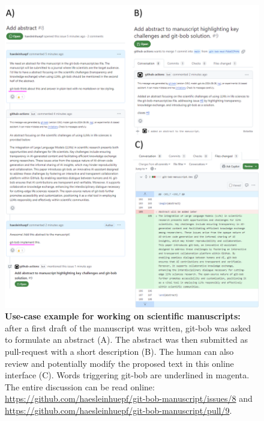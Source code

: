 \documentclass[sn-mathphys-num]{sn-jnl}%
\theoremstyle{thmstyleone}%
\theoremstyle{thmstyletwo}%
\theoremstyle{thmstylethree}%
\begin{document}
\begin{appendices}
\begin{figure}[h]
\centering
\includegraphics[width=\textwidth]{example_abstract_generation.png}
\caption{\textbf{Use-case example for working on scientific manuscripts:} after a first draft of the manuscript was written, git-bob was asked to formulate an abstract (A). The abstract was then submitted as pull-request with a short description (B). The human can also review and potentially modify the proposed text in this online interface (C). Words triggering git-bob are underlined in magenta. The entire discussion can be read online: \url{https://github.com/haesleinhuepf/git-bob-manuscript/issues/8} and \url{https://github.com/haesleinhuepf/git-bob-manuscript/pull/9}.
\newline
\newline
}
\label{fig:xample_abstract_generation}
\end{figure}

\end{appendices}

\end{document}

